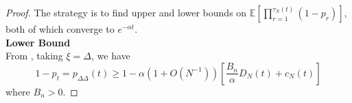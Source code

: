 \documentclass{article}
\newcommand{\E}{\mathbb{E}}
\newcommand{\1}[1]{\mathbb{I}_{#1}}
\begin{document}
\begin{proof}
%
The strategy is to find upper and lower bounds on $\E\left[ \prod_{r=1}^{\tau_N(t)} (1-p_r) \right]$, both of which converge to $e^{-\alpha t}$.\\
\textbf{Lower Bound}\\ %
From \citet[Equation (14)]{brown2020}, taking $\xi=\Delta$, we have
\begin{equation}
1-p_t = p_{\Delta\Delta}(t) \geq 1 - \alpha (1+O(N^{-1})) \left[\frac{B_n}{\alpha} D_N(t) + c_N(t) \right]
\end{equation}
where $B_n >0$.

\end{proof}
\end{document}
